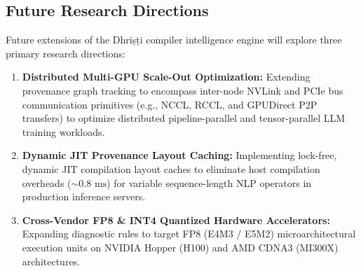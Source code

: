\documentclass[10pt,journal,compsoc]{IEEEtran}
\begin{document}
\subsection{Future Research Directions}
Future extensions of the Dhri\d{s}\d{t}i compiler intelligence engine will explore three primary research directions:
\begin{enumerate}
    \item \textbf{Distributed Multi-GPU Scale-Out Optimization:} Extending provenance graph tracking to encompass inter-node NVLink and PCIe bus communication primitives (e.g., NCCL, RCCL, and GPUDirect P2P transfers) to optimize distributed pipeline-parallel and tensor-parallel LLM training workloads.
    \item \textbf{Dynamic JIT Provenance Layout Caching:} Implementing lock-free, dynamic JIT compilation layout caches to eliminate host compilation overheads ($\sim 0.8\text{ ms}$) for variable sequence-length NLP operators in production inference servers.
    \item \textbf{Cross-Vendor FP8 \& INT4 Quantized Hardware Accelerators:} Expanding diagnostic rules to target FP8 (E4M3 / E5M2) microarchitectural execution units on NVIDIA Hopper (H100) and AMD CDNA3 (MI300X) architectures.
\end{enumerate}

\ifCLASSOPTIONcaptionsoff
  \newpage
\fi



\end{document}
